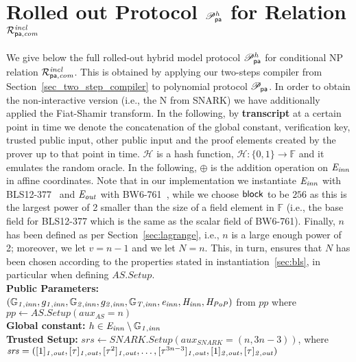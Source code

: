 \section{Rolled out Protocol $\mathscr{P}_{\mathsf{pa}}^{h}$ for Relation $\mathcal{R}^{\mathit{incl}}_{\mathsf{pa},\mathit{com}}$}
\label{sec:rolled_out}

\noindent We give below the full rolled-out hybrid model protocol $\mathscr{P}_{\mathsf{pa}}^{h}$ for conditional NP relation $\mathcal{R}^{\mathit{incl}}_{\mathsf{pa},\mathit{com}}$. This is obtained by applying 
our two-steps compiler from Section~\ref{sec_two_step_compiler} to polynomial protocol $\mathscr{P}_{\mathsf{pa}}$. In order to obtain the non-interactive version 
(i.e., the N from SNARK) we have additionally applied the Fiat-Shamir transform. In the following, by \textbf{transcript} at a certain point in time we denote the concatenation 
of the global constant, verification key, trusted public input, other public input and the proof elements created by the prover up to that point in time.
\noindent $\mathcal{H}$ is a hash function, $\mathcal{H}: \{0, 1\} \rightarrow \mathbb{F}$ and it emulates the random oracle.  
In the following, $\oplus$ is the addition operation on $\mathit{E}_{\mathit{inn}}$ in affine coordinates. Note that in our implementation we instantiate 
$\mathit{E}_{\mathit{inn}}$ with BLS12-377~\cite{zexe} and $\mathit{E}_{\mathit{out}}$ with BW6-761~\cite{BW6}, while we choose $\mathsf{block}$ to be $256$ as this is the largest power of 2 smaller 
than the size of a field element in $\mathbb{F}$ (i.e., the base field for BLS12-377 which is the same as the scalar field of BW6-761). 
Finally, $n$ has been defined as per Section~\ref{sec:lagrange}, i.e., $n$ is a large enough power of 2; 
moreover, we let $v= n-1$ and we let $N = n$. This, in turn, ensures that $N$ has been chosen according to the properties stated in 
instantiation~\ref{sec:bls}, in particular when defining $\mathit{AS.Setup}$. \\

\noindent \textbf{Public Parameters:} \\
$(\mathbb{G}_{\mathit{1,inn}}, g_{\mathit{1,inn}}, \mathbb{G}_{\mathit{2,inn}}, g_{\mathit{2,inn}}, \mathbb{G}_{\mathit{T,inn}}, \mathit{e}_{\mathit{inn}}, \mathit{H}_{\mathit{inn}}, \mathit{H}_{\mathit{PoP}})$ from $\mathit{pp}$ 
where $\mathit{pp} \leftarrow \mathit{AS.Setup}(\mathit{aux_{\mathit{AS}}}= n)$ \\

\noindent \textbf{Global constant:} $h \in \mathit{E}_{\mathit{inn}} \setminus \mathbb{G}_{\mathit{1,inn}}$ \\ 

\noindent \textbf{Trusted Setup:} $\mathit{srs} \leftarrow \mathit{SNARK.Setup}(\mathit{aux_{\mathit{SNARK}}} = (n, 3n-3))$,  
where $\mathit{srs} =([1]_{\mathit{1,out}}, [\tau]_{\mathit{1,out}}, [\tau^2]_{\mathit{1,out}}, \ldots, [\tau^{3n-3}]_{\mathit{1,out}}, [1]_{\mathit{2,out}}, [\tau]_{\mathit{2,out}})$ \\

